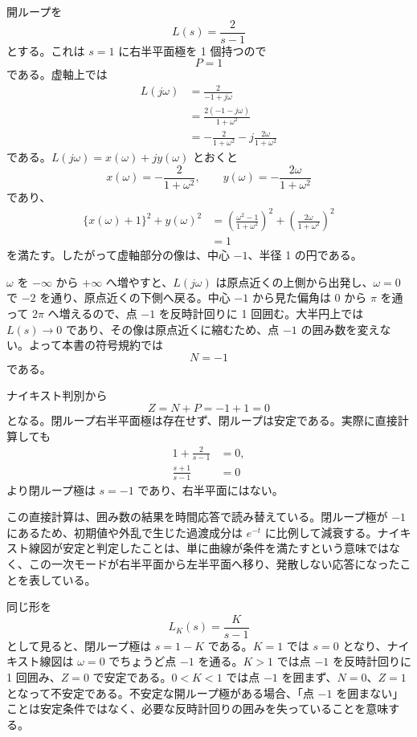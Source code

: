 \begin{example}[不安定開ループ極を持つナイキスト判別]
開ループを
\begin{equation}
  L(s)=\frac{2}{s-1}
\end{equation}
とする。これは $s=1$ に右半平面極を 1 個持つので
\begin{equation}
  P=1
\end{equation}
である。虚軸上では
\begin{align}
  L(j\omega)
  &=\frac{2}{-1+j\omega}\\
  &=\frac{2(-1-j\omega)}{1+\omega^2}\\
  &=-\frac{2}{1+\omega^2}
    -j\frac{2\omega}{1+\omega^2}
\end{align}
である。$L(j\omega)=x(\omega)+jy(\omega)$ とおくと
\begin{equation}
  x(\omega)=-\frac{2}{1+\omega^2},
  \qquad
  y(\omega)=-\frac{2\omega}{1+\omega^2}
\end{equation}
であり、
\begin{align}
  \{x(\omega)+1\}^2+y(\omega)^2
  &=
  \left(\frac{\omega^2-1}{1+\omega^2}\right)^2
  +
  \left(\frac{2\omega}{1+\omega^2}\right)^2\\
  &=1
\end{align}
を満たす。したがって虚軸部分の像は、中心 $-1$、半径 1 の円である。

$\omega$ を $-\infty$ から $+\infty$ へ増やすと、$L(j\omega)$ は原点近くの上側から出発し、$\omega=0$ で $-2$ を通り、原点近くの下側へ戻る。中心 $-1$ から見た偏角は $0$ から $\pi$ を通って $2\pi$ へ増えるので、点 $-1$ を反時計回りに 1 回囲む。大半円上では $L(s)\to0$ であり、その像は原点近くに縮むため、点 $-1$ の囲み数を変えない。よって本書の符号規約では
\begin{equation}
  N=-1
\end{equation}
である。

ナイキスト判別から
\begin{equation}
  Z=N+P=-1+1=0
\end{equation}
となる。閉ループ右半平面極は存在せず、閉ループは安定である。実際に直接計算しても
\begin{align}
  1+\frac{2}{s-1}&=0,\\
  \frac{s+1}{s-1}&=0
\end{align}
より閉ループ極は $s=-1$ であり、右半平面にはない。

この直接計算は、囲み数の結果を時間応答で読み替えている。閉ループ極が $-1$ にあるため、初期値や外乱で生じた過渡成分は $e^{-t}$ に比例して減衰する。ナイキスト線図が安定と判定したことは、単に曲線が条件を満たすという意味ではなく、この一次モードが右半平面から左半平面へ移り、発散しない応答になったことを表している。

同じ形を
\begin{equation}
  L_K(s)=\frac{K}{s-1}
\end{equation}
として見ると、閉ループ極は $s=1-K$ である。$K=1$ では $s=0$ となり、ナイキスト線図は $\omega=0$ でちょうど点 $-1$ を通る。$K>1$ では点 $-1$ を反時計回りに 1 回囲み、$Z=0$ で安定である。$0<K<1$ では点 $-1$ を囲まず、$N=0$、$Z=1$ となって不安定である。不安定な開ループ極がある場合、「点 $-1$ を囲まない」ことは安定条件ではなく、必要な反時計回りの囲みを失っていることを意味する。
\end{example}

